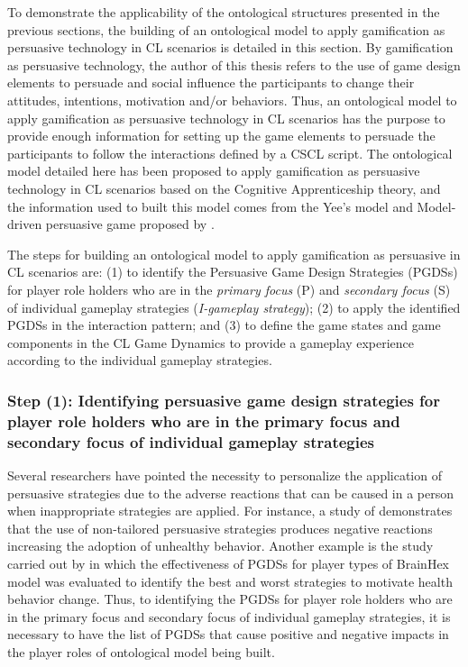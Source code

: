 To demonstrate the applicability of the ontological structures presented in the previous sections, the building of an ontological model to apply gamification as persuasive technology in CL scenarios is detailed in this section. By gamification as persuasive technology, the author of this thesis refers to the use of game design elements to persuade and social influence the participants to change their attitudes, intentions, motivation and/or behaviors. Thus, an ontological model to apply gamification as persuasive technology in CL scenarios has the purpose to provide enough information for setting up the game elements to persuade the participants to follow the interactions defined by a CSCL script. The ontological model detailed here has been proposed to apply gamification as persuasive technology in CL scenarios based on the Cognitive Apprenticeship theory, and the information used to built this model comes from the Yee's model \cite{Yee2006} and Model-driven persuasive game proposed by .

The steps for building an ontological model to apply gamification as persuasive in CL scenarios are: (1) to identify the Persuasive Game Design Strategies (PGDSs) for player role holders who are in the \emph{primary focus} (P) and \emph{secondary focus} (S) of individual gameplay strategies (\emph{I-gameplay strategy}); (2) to apply the identified PGDSs in the interaction pattern; and (3) to define the game states and game components in the CL Game Dynamics to provide a gameplay experience according to the individual gameplay strategies.

\subsubsection*{Step (1): Identifying persuasive game design strategies for player role holders who are in the primary focus and secondary focus of individual gameplay strategies}

Several researchers have pointed the necessity to personalize the application of persuasive strategies due to the adverse reactions that can be caused in a person when inappropriate strategies are applied. For instance, a study of  demonstrates that the use of non-tailored persuasive strategies produces negative reactions increasing the adoption of unhealthy behavior. Another example is the study carried out by  in which the effectiveness of PGDSs for player types of BrainHex model was evaluated to identify the best and worst strategies to motivate health behavior change. Thus, to identifying the PGDSs for player role holders who are in the primary focus and secondary focus of individual gameplay strategies, it is necessary to have the list of PGDSs that cause positive and negative impacts in the player roles of ontological model being built.

